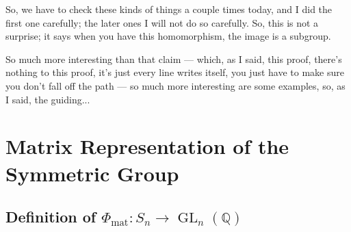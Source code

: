 \begin{speech}[00:05:53 - 00:06:20]
So, we have to check these kinds of things a couple times today, and I did the first one carefully; the later ones I will not do so carefully. So, this is not a surprise; it says when you have this homomorphism, the image is a subgroup.

So much more interesting than that claim --- which, as I said, this proof, there's nothing to this proof, it's just every line writes itself, you just have to make sure you don't fall off the path --- so much more interesting are some examples, so, as I said, the guiding...
\end{speech}

\section{Matrix Representation of the Symmetric Group}

\subsection{Definition of \texorpdfstring{$\Phi_{\text{mat}} \colon S_n \to \operatorname{GL}_n(\mathbb{Q})$}{Phi\_mat: S\_n -> GL\_n(Q)}}

